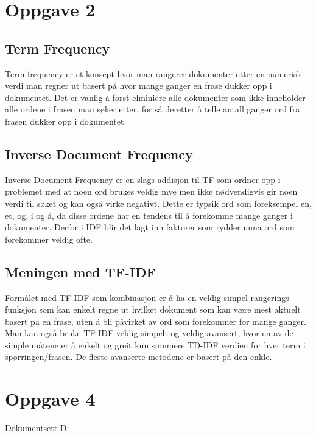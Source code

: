 \documentclass[]{article}
\begin{document}
\section{Oppgave 2}

\subsection{Term Frequency}
Term frequency er et konsept hvor man rangerer dokumenter etter en numerisk verdi man regner ut basert på hvor mange ganger en frase dukker opp i dokumentet. Det er vanlig å først elminiere alle dokumenter som ikke inneholder alle ordene i frasen man søker etter, for så deretter å telle antall ganger ord fra frasen dukker opp i dokumentet.
\subsection{Inverse Document Frequency}
Inverse Document Frequency er en slags addisjon til TF som ordner opp i problemet med at noen ord brukes veldig mye men ikke nødvendigvis gir noen verdi til søket og kan også virke negativt. Dette er typsik ord som foreksempel en, et, og, i og å, da disse ordene har en tendens til å forekomme mange ganger i dokumenter. Derfor i IDF blir det lagt inn faktorer som rydder unna ord som forekommer veldig ofte.

\subsection{Meningen med TF-IDF}
Formålet med TF-IDF som kombinasjon er å ha en veldig simpel rangerings funksjon som kan enkelt regne ut hvilket dokument som kan være mest aktuelt basert på en frase, uten å bli påvirket av ord som forekommer for mange ganger. 
Man kan også bruke TF-IDF veldig simpelt og veldig avansert, hvor en av de simple måtene er å enkelt og greit kun summere TD-IDF verdien for hver term i spørringen/frasen. De fleste avanserte metodene er basert på den enkle.

\pagebreak
\section{Oppgave 4}

\vspace{10 mm}

\vspace{5 mm}

Dokumentsett D:
\vspace{1 mm}
\end{document}
